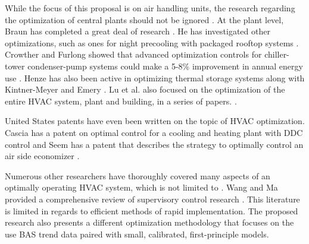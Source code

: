 While the focus of this proposal is on air handling units, the research regarding the optimization of central plants should not be ignored \cite{Ahn2001, Yu2008OptimizingChillers}. At the plant level, Braun has completed a great deal of research \cite{braun1990, Braun2007RP1252, Braun2007HybridCooling, Braun2007GeneralControl}. He has investigated other optimizations, such as ones for night precooling with packaged rooftop systems \cite{Braun2005}. Crowther and Furlong showed that advanced optimization controls for chiller-tower condenser-pump systems could make a 5-8\% improvement in annual energy use \cite{Crowther2004OptimizingTowers}. Henze has also been active in optimizing thermal storage systems \cite{Henze2005} along with Kintner-Meyer and Emery \cite{KintnerMeyer1995}. Lu et al. also focused on the optimization of the entire HVAC system, plant and building, in a series of papers. \cite{LuLu2004, LuLu2005Part1, LuLu2005Part2, LuLu2005HVACSystemOptimization}. 

United States patents have even been written on the topic of HVAC optimization. Cascia has a patent on optimal control for a cooling and heating plant with DDC control \cite{Cascia1999} and Seem has a patent that describes the strategy to optimally control an air side economizer \cite{Seem2002}. 

Numerous other researchers have thoroughly covered many aspects of an optimally operating HVAC system, which is not limited to \cite{Gruber2014AlternativeBuildings,Cho2009Single-ductOptimization,Nassif2005,Zaheer-uddin2000OptimalBuildings,Wang2000Model-basedAlgorithm,Henze2003EvaluationSystems,Liu2006ExperimentalFoundation, Zheng1996, Ning2010Neuro-optimalSystem,Atthajariyakul2004,Cui2004,XuXinhua2009,SunZhongwei2011,Mumma1997EnergyControl,Mossolly-Ghali-Ghaddar_2009_Energy}. Wang and Ma provided a comprehensive review of supervisory control research \cite{Wang2008SupervisoryReview}. This literature is limited in regards to efficient methods of rapid implementation. The proposed research also presents a different optimization methodology that focuses on the use BAS trend data paired with small, calibrated, first-principle models. 











